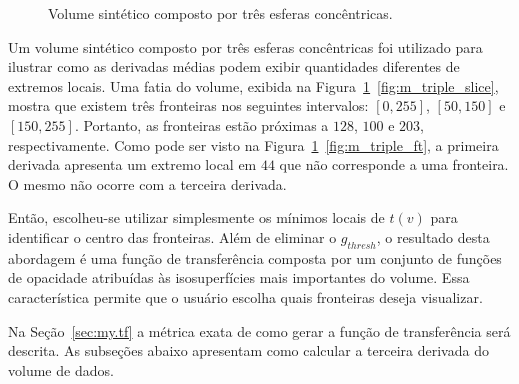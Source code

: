 \begin{figure}
	\centering
	\caption{Volume sintético composto por três esferas concêntricas.}
	\label{fig:m_triple}
\end{figure}
	
	Um volume sintético composto por três esferas concêntricas foi utilizado para ilustrar como as derivadas médias podem exibir quantidades diferentes de extremos locais. Uma fatia do volume, exibida na Figura~\ref{fig:m_triple}~\ref{fig:m_triple_slice}, mostra que existem três fronteiras nos seguintes intervalos: $ [0,255] $, $ [50,150] $ e $ [150,255] $. Portanto, as fronteiras estão próximas a $ 128 $, $ 100 $ e $ 203 $, respectivamente. Como pode ser visto na Figura~\ref{fig:m_triple}~\ref{fig:m_triple_ft}, a primeira derivada apresenta um extremo local em $ 44 $ que não corresponde a uma fronteira. O mesmo não ocorre com a terceira derivada.
	
	Então, escolheu-se utilizar simplesmente os mínimos locais de $ t(v) $ para identificar o centro das fronteiras. Além de eliminar o $ g_{thresh} $, o resultado desta abordagem é uma função de transferência composta por um conjunto de funções de opacidade atribuídas às isosuperfícies mais importantes do volume. Essa característica permite que o usuário escolha quais fronteiras deseja visualizar. 
	
	Na Seção~\ref{sec:my.tf} a métrica exata de como gerar a função de transferência será descrita. As subseções abaixo apresentam como calcular a terceira derivada do volume de dados.
	
